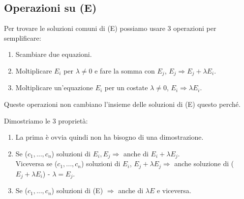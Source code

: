 \subsection{Operazioni su (E)}
Per trovare le soluzioni comuni di (E) possiamo usare 3 operazioni per semplificare:
\begin{enumerate}[label=\Alph*]
    \item Scambiare due equazioni.
    \item Moltiplicare $E_i$ per $\lambda \neq 0$ e fare la somma con $E_j$, $E_j \Rightarrow E_j + \lambda E_i$.
    \item Moltiplicare un'equazione $E_i$ per un costate $\lambda \neq 0$, $E_i \Rightarrow \lambda E_i$.
\end{enumerate}

\begin{observation}
Queste operazioni non cambiano l'insieme delle soluzioni di (E) questo perché.
\end{observation}

\begin{demostration}
Dimostriamo le 3 proprietà:
\begin{enumerate}[label=\Alph*]
    \item La prima è ovvia quindi non ha bisogno di una dimostrazione.
    \item Se ($c_1, ..., c_n$) soluzioni di $E_i, E_j \Rightarrow$ anche di $E_i + \lambda E_j$.\\
    Viceversa se ($c_1, ..., c_n$) soluzioni di $E_i$, $E_j + \lambda E_j \Rightarrow$ anche soluzione di ($E_j + \lambda E_i$) - $\lambda = E_j$.
    \item Se ($c_1, ..., c_n$) soluzioni di (E) $\Rightarrow$ anche di $\lambda E$ e viceversa.
\end{enumerate}
\end{demostration}

